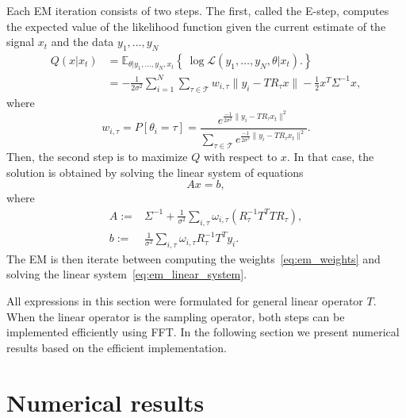 \documentclass[english,12pt]{article}
\newcommand{\E}{\mathbb{E}}
\numberwithin{equation}{section}
\numberwithin{thm}{section} %
\begin{document}
Each EM iteration consists of two steps.
The first, called the E-step, computes the expected value of the likelihood function  given the current estimate of the signal $x_t$ and the data $y_1,\ldots,y_N$
\begin{equation}
\begin{split}
Q(x|x_t) &= \E_{\theta|y_1,\ldots,y_N,x_t}\left\{\ \log \mathcal{L}(y_1,\ldots,y_N,\theta|x_t).   \right\} \\
& = -\frac{1}{2\sigma^2}\sum_{i=1}^{N}\sum_{\tau\in\mathcal{T}}w_{i,\tau}\|y_i - TR_{\tau}x\| - \frac{1}{2}x^T\Sigma^{-1}x,
\end{split}
\end{equation} 
where 
\begin{equation} \label{eq:em_weights}
w_{i,\tau} = P[\theta_i = \tau] = \frac{e^{\frac{-1}{2\sigma^2}\|y_i-TR_\tau x_t\|^2 }}{\sum_{\tau\in\mathcal{T}}e^{\frac{-1}{2\sigma^2}\|y_i-TR_\tau x_t\|^2 }}.
\end{equation}
Then,  the second step is to maximize $Q$ with respect to $x$. In that case, the solution is obtained by solving the linear system of equations
\begin{equation} \label{eq:em_linear_system}
Ax = b,
\end{equation}
where 
\begin{align}
A :=&  \Sigma^{-1} + \frac{1}{\sigma^2}\sum_{i,\tau}\omega_{i,\tau} (R_\tau^{-1}T^TTR_\tau),\\ 
b :=&   \frac{1}{\sigma^2} \sum_{i,\tau}\omega_{i,\tau}R_\tau^{-1}T^Ty_i.
\end{align}
The EM is then iterate between computing the weights~\eqref{eq:em_weights} and solving the linear system~\eqref{eq:em_linear_system}. 

All expressions in this section were formulated for general linear operator $T$. When the linear operator is the sampling operator, both steps can be implemented efficiently using FFT. In the following section we present numerical results based on the efficient implementation. 

\section{Numerical results}
\end{document}
